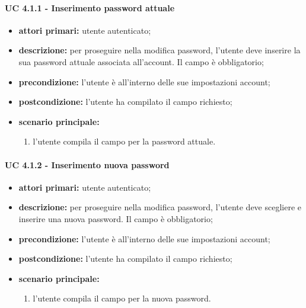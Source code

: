 				\paragraph{UC 4.1.1 - Inserimento password attuale}
				\begin{itemize}
					\item \textbf{attori primari:} utente autenticato;
					\item \textbf{descrizione:} per proseguire nella modifica password, l'utente deve inserire la sua password attuale associata all'account. Il campo è obbligatorio;
					\item \textbf{precondizione:} l'utente è all'interno delle sue impostazioni account;
					\item \textbf{postcondizione:} l'utente ha compilato il campo richiesto;
					\item \textbf{scenario principale:}
					\begin{enumerate}
						\item l'utente compila il campo per la password attuale.
					\end{enumerate}
				\end{itemize}

				\paragraph{UC 4.1.2 - Inserimento nuova password}
				\begin{itemize}
					\item \textbf{attori primari:} utente autenticato;
					\item \textbf{descrizione:} per proseguire nella modifica password, l'utente deve scegliere e inserire una nuova password. Il campo è obbligatorio;
					\item \textbf{precondizione:} l'utente è all'interno delle sue impostazioni account;
					\item \textbf{postcondizione:} l'utente ha compilato il campo richiesto;
					\item \textbf{scenario principale:}
					\begin{enumerate}
						\item l'utente compila il campo per la nuova password.
					\end{enumerate}
				\end{itemize}

